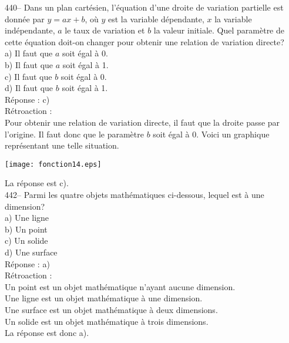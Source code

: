 ﻿\documentclass[letterpaper, 12pt]{article}
\begin{document}
440-- Dans un plan cart\'esien, l'\'equation d'une droite de variation
partielle est donn\'ee par $y=ax+b$, o\`u $y$ est la variable d\'ependante,
$x$ la variable ind\'ependante, $a$ le taux de variation et $b$ la valeur
initiale.  Quel param\`etre de cette \'equation doit-on changer pour obtenir
une relation de variation directe?\\
a) Il faut que $a$ soit \'egal \`a 0.\\
b) Il faut que $a$ soit \'egal \`a 1.\\
c) Il faut que $b$ soit \'egal \`a 0.\\
d) Il faut que $b$ soit \'egal \`a 1.\\

R\'eponse : c)\\

R\'etroaction : \\
Pour obtenir une relation de variation directe, il faut que la droite passe
par l'origine.  Il faut donc que le param\`etre $b$ soit \'egal \`a 0.
Voici un graphique repr\'esentant une telle situation.  \\
    \begin{center}
    \texttt{[image: fonction14.eps]}
    \end{center}

La r\'eponse est c).\\


442-- Parmi les quatre objets math\'ematiques ci-dessous, lequel est \`a une
  dimension?\\
a) Une ligne\\
b) Un point\\
c) Un solide\\
d) Une surface\\


R\'eponse : a)\\

R\'etroaction : \\

Un point est un objet math\'ematique n'ayant aucune dimension.\\
Une ligne est un objet math\'ematique \`a une dimension.\\
Une surface est un objet math\'ematique \`a deux dimensions.\\
Un solide est un objet math\'ematique \`a trois dimensions.\\
La r\'eponse est donc a).\\
\end{document}

